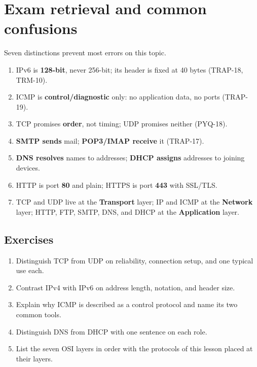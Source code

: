 \documentclass[11pt]{article}
\begin{document}
\section{Exam retrieval and common confusions}
Seven distinctions prevent most errors on this topic.
\begin{enumerate}
  \item IPv6 is \textbf{128-bit}, never 256-bit; its header is fixed at 40
    bytes (TRAP-18, TRM-10).
  \item ICMP is \textbf{control/diagnostic} only: no application data, no
    ports (TRAP-19).
  \item TCP promises \textbf{order}, not timing; UDP promises neither
    (PYQ-18).
  \item \textbf{SMTP sends} mail; \textbf{POP3/IMAP receive} it (TRAP-17).
  \item \textbf{DNS resolves} names to addresses; \textbf{DHCP assigns}
    addresses to joining devices.
  \item HTTP is port \textbf{80} and plain; HTTPS is port \textbf{443} with
    SSL/TLS.
  \item TCP and UDP live at the \textbf{Transport} layer; IP and ICMP at the
    \textbf{Network} layer; HTTP, FTP, SMTP, DNS, and DHCP at the
    \textbf{Application} layer.
\end{enumerate}

\subsection*{Exercises}
\begin{enumerate}[label=\arabic*.]
  \item Distinguish TCP from UDP on reliability, connection setup, and one
    typical use each.
  \item Contrast IPv4 with IPv6 on address length, notation, and header size.
  \item Explain why ICMP is described as a control protocol and name its two
    common tools.
  \item Distinguish DNS from DHCP with one sentence on each role.
  \item List the seven OSI layers in order with the protocols of this lesson
    placed at their layers.
\end{enumerate}
\end{document}
